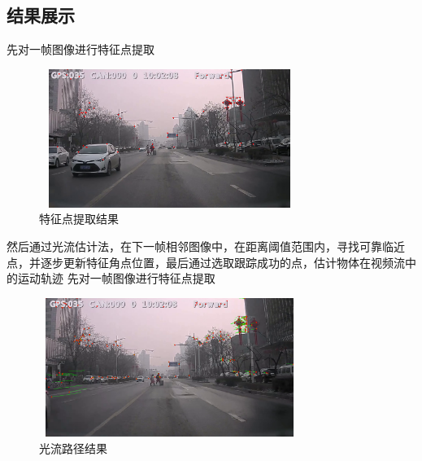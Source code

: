 \documentclass[UTF8]{ctexart}
\begin{document}
\begin{CJK*}{UTF8}{gbsn}
\section{结果展示}
先对一帧图像进行特征点提取
\begin{figure}[htbp]
    \centering
    \includegraphics[height=4.5cm,width=8.5cm]{result_1.png}
    \caption{特征点提取结果}
\end{figure}

然后通过光流估计法，在下一帧相邻图像中，在距离阈值范围内，寻找可靠临近点，并逐步更新特征角点位置，最后通过选取跟踪成功的点，估计物体在视频流中的运动轨迹
先对一帧图像进行特征点提取
\begin{figure}[htbp]
    \centering
    \includegraphics[height=4.5cm,width=8.5cm]{result_2.png}
    \caption{光流路径结果}
\end{figure}

\end{CJK*}
\end{document}
